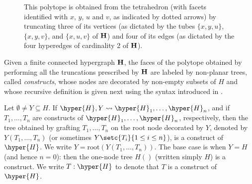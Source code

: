 \begin{figure}
{}


 
\caption{This polytope is obtained from the  tetrahedron (with facets identified with $x$, $y$, $u$ and $v$, as indicated by dotted arrows) by truncating three of its vertices (as dictated by the tubes $\{x,y,u\}$, $\{x,y,v\}$, and $\{x,u,v\}$ of ${\bf H}$) and four of its edges (as dictated by the four hyperedges of cardinality 2 of ${\bf H}$).  \label{hemiassoc}}
\end{figure} 
Given a finite connected hypergraph ${\bf H}$, the faces of the   polytope obtained by performing  all the truncations   prescribed by ${\bf H}$  are labeled by non-planar trees, called {\em constructs}, whose nodes are decorated by non-empty subsets of $H$ and whose recursive definition  is given next using the syntax introduced in \cite{COI}.

Let  $\emptyset\neq Y\subseteq H$. If   $\hyper{H},Y  \leadsto \hyper{H}_1,\ldots, \hyper{H}_n$, and if  $T_1,\ldots,T_n$ are constructs of $\hyper{H}_1,\ldots,\hyper{H}_n$, respectively, then the tree obtained by grafting $T_1,\ldots,T_n$ on the root node decorated by $Y$, denoted by $Y(T_1,\ldots,T_n)$ (or sometimes $Y\setc{T_i}{1\leq i\leq n}$), is a construct of  $\hyper{H}$. We write $Y=\mbox{root}(Y(T_1,\ldots,T_n))$. 
 The base case is when $Y=H$ (and hence $n=0$): then the one-node tree $H()$ (written simply $H$) is a construct.
We write $T:\hyper{H}$ to denote that $T$ is a construct of $\hyper{H}$.  


